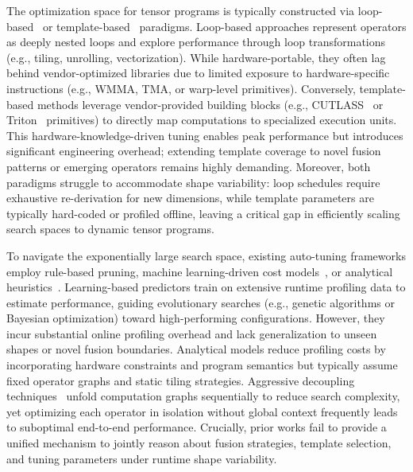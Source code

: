 

The optimization space for tensor programs is typically constructed via loop-based~\cite{zheng2020ansor,li2023exploiting} or 
template-based~\cite{chen2024evt} paradigms. Loop-based approaches represent operators as deeply nested loops and explore performance through loop 
transformations (e.g., tiling, unrolling, vectorization). While hardware-portable, they often lag behind vendor-optimized libraries due to limited exposure to hardware-specific instructions (e.g., WMMA, TMA, or warp-level primitives). Conversely, template-based methods leverage vendor-provided building blocks
(e.g., CUTLASS~\cite{nvidia22cutlass} or Triton~\cite{tillet2019triton} primitives) to directly map computations to specialized execution units. This 
hardware-knowledge-driven tuning enables peak performance but introduces significant engineering overhead; extending template coverage to novel fusion patterns 
or emerging operators remains highly demanding. Moreover, both paradigms struggle to accommodate shape variability: loop schedules require exhaustive re-derivation 
for new dimensions, while template parameters are typically hard-coded or profiled offline, leaving a critical gap in efficiently scaling search spaces to dynamic 
tensor programs.

To navigate the exponentially large search space, existing auto-tuning frameworks employ rule-based pruning, machine learning-driven cost 
models~\cite{zheng2021tenset}, or analytical heuristics~\cite{ragan2013halide}. 
Learning-based predictors train on extensive runtime profiling data to 
estimate performance, guiding evolutionary searches (e.g., genetic algorithms or Bayesian optimization) toward high-performing configurations. 
However, they incur substantial online profiling overhead and lack generalization to unseen shapes or novel fusion boundaries. Analytical models reduce profiling costs by incorporating 
hardware constraints and program semantics but typically assume fixed operator graphs and static tiling strategies. Aggressive decoupling 
techniques~\cite{ansel2024pytorch} unfold computation graphs sequentially to reduce search complexity, yet optimizing each operator in isolation without global 
context frequently leads to suboptimal end-to-end performance. Crucially, prior works fail to provide a unified mechanism to jointly reason about fusion strategies, 
template selection, and tuning parameters under runtime shape variability.

